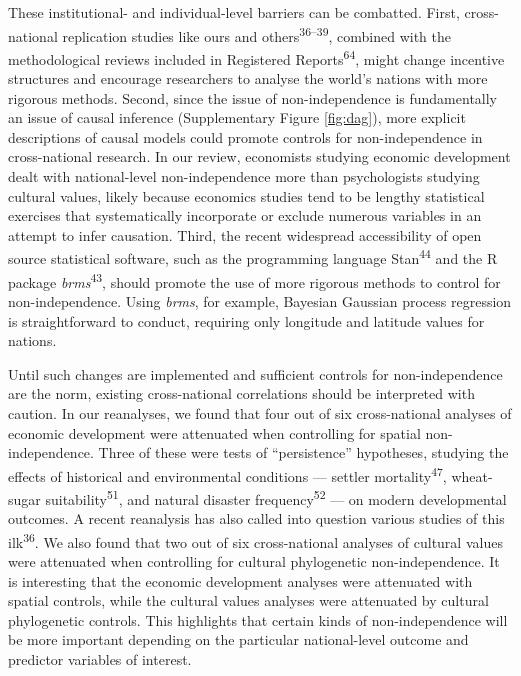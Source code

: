 \documentclass[
  english,
  man,floatsintext]{apa6}
\begin{document}
These institutional- and individual-level barriers can be combatted. First, cross-national replication studies like ours and others\textsuperscript{36--39}, combined with the methodological reviews included in Registered Reports\textsuperscript{64}, might change incentive structures and encourage researchers to analyse the world's nations with more rigorous methods. Second, since the issue of non-independence is fundamentally an issue of causal inference (Supplementary Figure \ref{fig:dag}), more explicit descriptions of causal models could promote controls for non-independence in cross-national research. In our review, economists studying economic development dealt with national-level non-independence more than psychologists studying cultural values, likely because economics studies tend to be lengthy statistical exercises that systematically incorporate or exclude numerous variables in an attempt to infer causation. Third, the recent widespread accessibility of open source statistical software, such as the programming language Stan\textsuperscript{44} and the R package \emph{brms}\textsuperscript{43}, should promote the use of more rigorous methods to control for non-independence. Using \emph{brms}, for example, Bayesian Gaussian process regression is straightforward to conduct, requiring only longitude and latitude values for nations.

Until such changes are implemented and sufficient controls for non-independence are the norm, existing cross-national correlations should be interpreted with caution. In our reanalyses, we found that four out of six cross-national analyses of economic development were attenuated when controlling for spatial non-independence. Three of these were tests of \enquote{persistence} hypotheses, studying the effects of historical and environmental conditions --- settler mortality\textsuperscript{47}, wheat-sugar suitability\textsuperscript{51}, and natural disaster frequency\textsuperscript{52} --- on modern developmental outcomes. A recent reanalysis has also called into question various studies of this ilk\textsuperscript{36}. We also found that two out of six cross-national analyses of cultural values were attenuated when controlling for cultural phylogenetic non-independence. It is interesting that the economic development analyses were attenuated with spatial controls, while the cultural values analyses were attenuated by cultural phylogenetic controls. This highlights that certain kinds of non-independence will be more important depending on the particular national-level outcome and predictor variables of interest.
\end{document}
